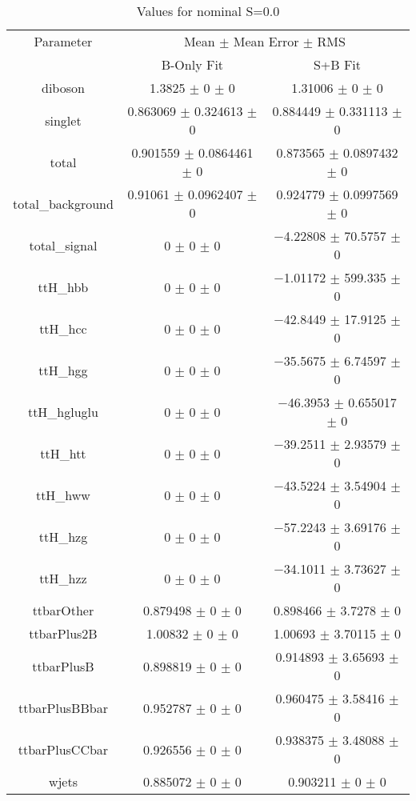 \begin{table}
\centering
\caption{Values for nominal S=0.0}
\begin{tabular}{ccc}
\toprule
Parameter & \multicolumn{2}{c}{Mean $\pm$ Mean Error $\pm$ RMS}\\
 & B-Only Fit & S+B Fit\\
\midrule
diboson & \num{1.3825} $\pm$ \num{0} $\pm$ \num{0} & \num{1.31006} $\pm$ \num{0} $\pm$ \num{0}\\
singlet & \num{0.863069} $\pm$ \num{0.324613} $\pm$ \num{0} & \num{0.884449} $\pm$ \num{0.331113} $\pm$ \num{0}\\
total & \num{0.901559} $\pm$ \num{0.0864461} $\pm$ \num{0} & \num{0.873565} $\pm$ \num{0.0897432} $\pm$ \num{0}\\
total\_background & \num{0.91061} $\pm$ \num{0.0962407} $\pm$ \num{0} & \num{0.924779} $\pm$ \num{0.0997569} $\pm$ \num{0}\\
total\_signal & \num{0} $\pm$ \num{0} $\pm$ \num{0} & \num{-4.22808} $\pm$ \num{70.5757} $\pm$ \num{0}\\
ttH\_hbb & \num{0} $\pm$ \num{0} $\pm$ \num{0} & \num{-1.01172} $\pm$ \num{599.335} $\pm$ \num{0}\\
ttH\_hcc & \num{0} $\pm$ \num{0} $\pm$ \num{0} & \num{-42.8449} $\pm$ \num{17.9125} $\pm$ \num{0}\\
ttH\_hgg & \num{0} $\pm$ \num{0} $\pm$ \num{0} & \num{-35.5675} $\pm$ \num{6.74597} $\pm$ \num{0}\\
ttH\_hgluglu & \num{0} $\pm$ \num{0} $\pm$ \num{0} & \num{-46.3953} $\pm$ \num{0.655017} $\pm$ \num{0}\\
ttH\_htt & \num{0} $\pm$ \num{0} $\pm$ \num{0} & \num{-39.2511} $\pm$ \num{2.93579} $\pm$ \num{0}\\
ttH\_hww & \num{0} $\pm$ \num{0} $\pm$ \num{0} & \num{-43.5224} $\pm$ \num{3.54904} $\pm$ \num{0}\\
ttH\_hzg & \num{0} $\pm$ \num{0} $\pm$ \num{0} & \num{-57.2243} $\pm$ \num{3.69176} $\pm$ \num{0}\\
ttH\_hzz & \num{0} $\pm$ \num{0} $\pm$ \num{0} & \num{-34.1011} $\pm$ \num{3.73627} $\pm$ \num{0}\\
ttbarOther & \num{0.879498} $\pm$ \num{0} $\pm$ \num{0} & \num{0.898466} $\pm$ \num{3.7278} $\pm$ \num{0}\\
ttbarPlus2B & \num{1.00832} $\pm$ \num{0} $\pm$ \num{0} & \num{1.00693} $\pm$ \num{3.70115} $\pm$ \num{0}\\
ttbarPlusB & \num{0.898819} $\pm$ \num{0} $\pm$ \num{0} & \num{0.914893} $\pm$ \num{3.65693} $\pm$ \num{0}\\
ttbarPlusBBbar & \num{0.952787} $\pm$ \num{0} $\pm$ \num{0} & \num{0.960475} $\pm$ \num{3.58416} $\pm$ \num{0}\\
ttbarPlusCCbar & \num{0.926556} $\pm$ \num{0} $\pm$ \num{0} & \num{0.938375} $\pm$ \num{3.48088} $\pm$ \num{0}\\
wjets & \num{0.885072} $\pm$ \num{0} $\pm$ \num{0} & \num{0.903211} $\pm$ \num{0} $\pm$ \num{0}\\
\bottomrule
\end{tabular}
\end{table}